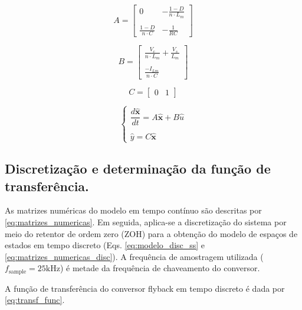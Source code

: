 \documentclass{article}
\begin{document}
\begin{equation}
  A =
  \begin{bmatrix}
    0                     & - \frac{1-D}{n\cdot L_m} \\ \\
    \frac{1-D}{n \cdot C} & -\frac{1}{R C}
  \end{bmatrix}
  \label{eq:matriz_a}
\end{equation}

\begin{equation}
  B =
  \begin{bmatrix}
    \frac{V_c}{n \cdot L_m} + \frac{V_s}{L_m} \\ \\
    \frac{- I_{Lm}}{n \cdot C}
  \end{bmatrix}
  \label{eq:matriz_b}
\end{equation}

\begin{equation}
  C = \begin{bmatrix}
    0 & 1
  \end{bmatrix}
  \label{eq:matriz_c}
\end{equation}

\begin{equation}
  \begin{cases}
    \dfrac{d \mathbf{\hat{x}}}{d t} = A \mathbf{\hat{x}} + B \hat{u} \\ \\
    \hat{y} = C \mathbf{\hat{x}}
  \end{cases}
  \label{eq:modelo_ss}
\end{equation}

\subsection{Discretização e determinação da função de transferência.}

As matrizes numéricas do modelo em tempo contínuo são descritas por \eqref{eq:matrizes_numericas}. Em seguida, aplica-se a discretização do sistema por meio do retentor de ordem zero (ZOH) para a obtenção do modelo de espaços de estados em tempo discreto (Eqs. \eqref{eq:modelo_disc_ss} e \eqref{eq:matrizes_numericas_disc}). A frequência de amostragem utilizada (\(f_\mathrm{sample} = 25 \text{kHz}\)) é metade da frequência de chaveamento do conversor.

A função de transferência do conversor flyback em tempo discreto é dada por \eqref{eq:transf_func}.
\end{document}

